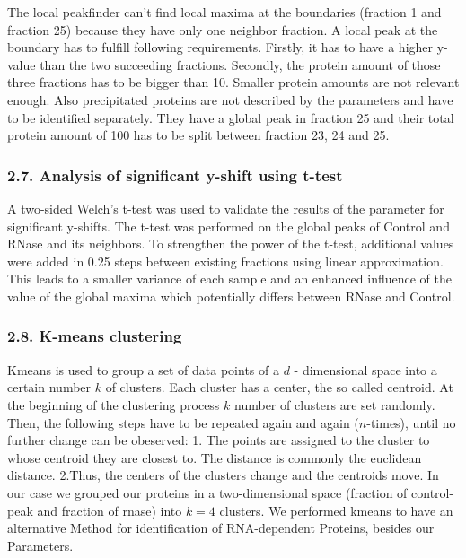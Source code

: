 \documentclass[
  12pt,
]{article}
\begin{document}
The local peakfinder can't find local maxima at the boundaries (fraction
1 and fraction 25) because they have only one neighbor fraction. A local
peak at the boundary has to fulfill following requirements. Firstly, it
has to have a higher y-value than the two succeeding fractions.
Secondly, the protein amount of those three fractions has to be bigger
than 10. Smaller protein amounts are not relevant enough. Also
precipitated proteins are not described by the parameters and have to be
identified separately. They have a global peak in fraction 25 and their
total protein amount of 100 has to be split between fraction 23, 24 and
25.

\hypertarget{analysis-of-significant-y-shift-using-t-test}{%
\subsubsection{2.7. Analysis of significant y-shift using
t-test}\label{analysis-of-significant-y-shift-using-t-test}}

A two-sided Welch's t-test was used to validate the results of the
parameter for significant y-shifts. The t-test was performed on the
global peaks of Control and RNase and its neighbors. To strengthen the
power of the t-test, additional values were added in 0.25 steps between
existing fractions using linear approximation. This leads to a smaller
variance of each sample and an enhanced influence of the value of the
global maxima which potentially differs between RNase and Control.

\hypertarget{k-means-clustering}{%
\subsubsection{2.8. K-means clustering}\label{k-means-clustering}}

Kmeans is used to group a set of data points of a \(d\) - dimensional
space into a certain number \(k\) of clusters. Each cluster has a
center, the so called centroid. At the beginning of the clustering
process \(k\) number of clusters are set randomly. Then, the following
steps have to be repeated again and again (\(n\)-times), until no
further change can be obeserved: 1. The points are assigned to the
cluster to whose centroid they are closest to. The distance is commonly
the euclidean distance. 2.Thus, the centers of the clusters change and
the centroids move. In our case we grouped our proteins in a
two-dimensional space (fraction of control-peak and fraction of rnase)
into \(k=4\) clusters. We performed kmeans to have an alternative Method
for identification of RNA-dependent Proteins, besides our Parameters.
\end{document}
